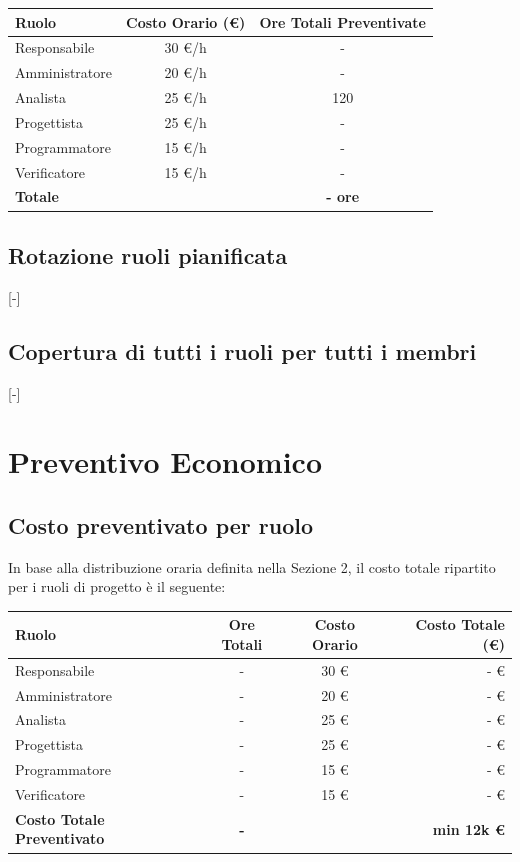 \documentclass[11pt, a4paper]{article}
\begin{document}
	\begin{table}[ht]
		\centering
		\renewcommand{\arraystretch}{1.3}
		\begin{tabularx}{\textwidth}{X c c}
			\toprule
			\textbf{Ruolo} & \textbf{Costo Orario (\euro)} & \textbf{Ore Totali Preventivate} \\
			\midrule
			Responsabile & 30 €/h & - \\
			Amministratore & 20 €/h & - \\
			Analista & 25 €/h & 120 \\
			Progettista & 25 €/h & - \\
			Programmatore & 15 €/h & - \\
			Verificatore & 15 €/h & - \\
			\midrule
			\textbf{Totale} & & \textbf{- ore} \\
			\bottomrule
		\end{tabularx}
	\end{table}
	
	\subsection{Rotazione ruoli pianificata}
	[-]
	
	\subsection{Copertura di tutti i ruoli per tutti i membri}
	[-]
	
	\newpage
	\section{Preventivo Economico}
	
	\subsection{Costo preventivato per ruolo}
	In base alla distribuzione oraria definita nella Sezione 2, il costo totale ripartito per i ruoli di progetto è il seguente:
	
	\begin{table}[ht]
		\centering
		\renewcommand{\arraystretch}{1.3}
		\begin{tabularx}{\textwidth}{X c c r}
			\toprule
			\textbf{Ruolo} & \textbf{Ore Totali} & \textbf{Costo Orario} & \textbf{Costo Totale (\euro)} \\
			\midrule
			Responsabile & - & 30 € & - € \\
			Amministratore & - & 20 € & - € \\
			Analista & - & 25 € & - € \\
			Progettista & - & 25 € & - € \\
			Programmatore & - & 15 € & - € \\
			Verificatore & - & 15 € & - € \\
			\midrule
			\textbf{Costo Totale Preventivato} & \textbf{-} & & \textbf{min 12k €} \\
			\bottomrule
		\end{tabularx}
	\end{table}
	
\end{document}

